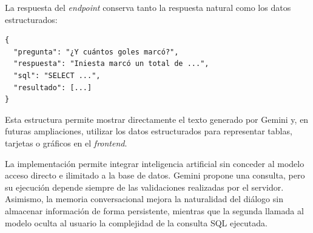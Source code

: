 La respuesta del \textit{endpoint} conserva tanto la respuesta natural como los datos estructurados:

\begin{verbatim}
{
  "pregunta": "¿Y cuántos goles marcó?",
  "respuesta": "Iniesta marcó un total de ...",
  "sql": "SELECT ...",
  "resultado": [...]
}
\end{verbatim}

Esta estructura permite mostrar directamente el texto generado por Gemini y, en futuras ampliaciones, utilizar los datos estructurados para representar tablas, tarjetas o gráficos en el \textit{frontend}.

La implementación permite integrar inteligencia artificial sin conceder al modelo acceso directo e ilimitado a la base de datos. Gemini propone una consulta, pero su ejecución depende siempre de las validaciones realizadas por el servidor. Asimismo, la memoria conversacional mejora la naturalidad del diálogo sin almacenar información de forma persistente, mientras que la segunda llamada al modelo oculta al usuario la complejidad de la consulta SQL ejecutada.




